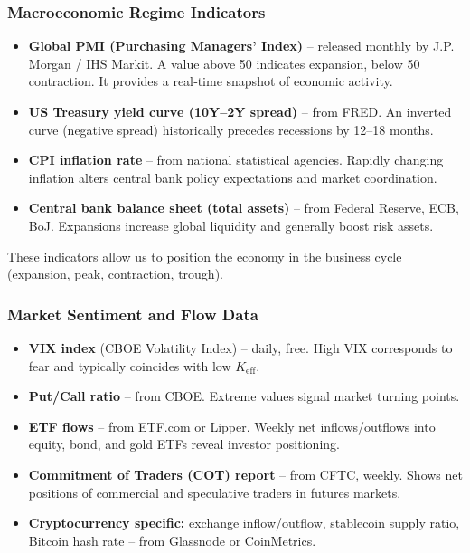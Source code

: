 \documentclass[11pt,a4paper]{article}
\theoremstyle{remark}
\begin{document}
	\subsubsection{Macroeconomic Regime Indicators}
	\begin{itemize}
		\item \textbf{Global PMI (Purchasing Managers’ Index)} – released monthly by J.P. Morgan / IHS Markit. A value above 50 indicates expansion, below 50 contraction. It provides a real‑time snapshot of economic activity.
		\item \textbf{US Treasury yield curve (10Y–2Y spread)} – from FRED. An inverted curve (negative spread) historically precedes recessions by 12–18 months.
		\item \textbf{CPI inflation rate} – from national statistical agencies. Rapidly changing inflation alters central bank policy expectations and market coordination.
		\item \textbf{Central bank balance sheet (total assets)} – from Federal Reserve, ECB, BoJ. Expansions increase global liquidity and generally boost risk assets.
	\end{itemize}
	These indicators allow us to position the economy in the business cycle (expansion, peak, contraction, trough).
	
	\subsubsection{Market Sentiment and Flow Data}
	\begin{itemize}
		\item \textbf{VIX index} (CBOE Volatility Index) – daily, free. High VIX corresponds to fear and typically coincides with low \(K_{\mathrm{eff}}\).
		\item \textbf{Put/Call ratio} – from CBOE. Extreme values signal market turning points.
		\item \textbf{ETF flows} – from ETF.com or Lipper. Weekly net inflows/outflows into equity, bond, and gold ETFs reveal investor positioning.
		\item \textbf{Commitment of Traders (COT) report} – from CFTC, weekly. Shows net positions of commercial and speculative traders in futures markets.
		\item \textbf{Cryptocurrency specific:} exchange inflow/outflow, stablecoin supply ratio, Bitcoin hash rate – from Glassnode or CoinMetrics.
	\end{itemize}
	
\end{document}
